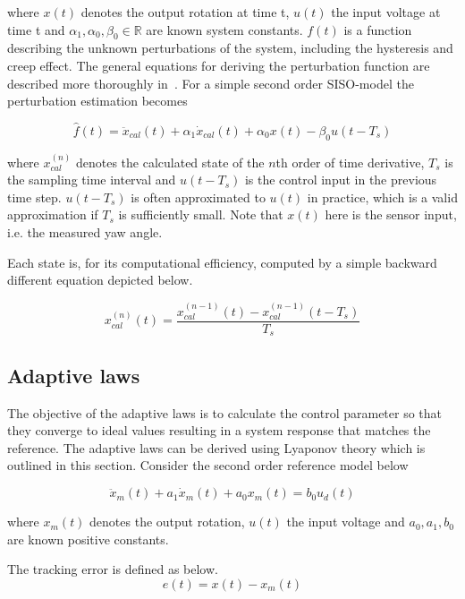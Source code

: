 where $x(t)$ denotes the output rotation at time t, $u(t)$ the input voltage at time t and $\alpha_1, \alpha_0, \beta_0 \in \mathbb{R}$ are known system constants. $f(t)$ is a function describing the unknown perturbations of the system, including the hysteresis and creep effect. The general equations for deriving the perturbation function are described more thoroughly in~\citep{Elmali:1996}. For a simple second order SISO-model the perturbation estimation becomes

\begin{equation}
  \label{eq:perturbation}
  \hat{f}(t) = \ddot{x}_{cal}(t) + \alpha_1\dot{x}_{cal}(t) +  \alpha_0x(t) - \beta_0u(t-T_s)
\end{equation}

where $x_{cal}^{(n)}$ denotes the calculated state of the $n$th order of time derivative, $T_s$ is the sampling time interval and $u(t-T_s)$ is the control input in the previous time step. $u(t-T_s)$ is often approximated to $u(t)$ in practice, which is a valid approximation if $T_s$ is sufficiently small. Note that $x(t)$ here is the sensor input, i.e. the measured yaw angle.

Each state is, for its computational efficiency, computed by a simple backward different equation depicted below.

\begin{equation}
  \label{eq:backward}
  x_{cal}^{(n)}(t) = \frac{x_{cal}^{(n-1)}(t) - x_{cal}^{(n-1)}(t-T_s)}{T_s}
\end{equation}

\subsection{Adaptive laws}
The objective of the adaptive laws is to calculate the control parameter so that they converge to ideal values resulting in a system response that matches the reference. The adaptive laws can be derived using Lyaponov theory which is outlined in this section. Consider the second order reference model below

\begin{equation}
  \label{eq:refmodel}
  \ddot{x}_m(t) + a_1\dot{x}_m(t) +  a_0x_m(t) = b_0u_d(t)
\end{equation}

where $x_m(t)$ denotes the output rotation, $u(t)$ the input voltage and $a_0, a_1, b_0$ are known positive constants.

The tracking error is defined as below.
\begin{equation}
  \label{eq:stateerror}
  e(t) = x(t) - x_m(t)
\end{equation}

